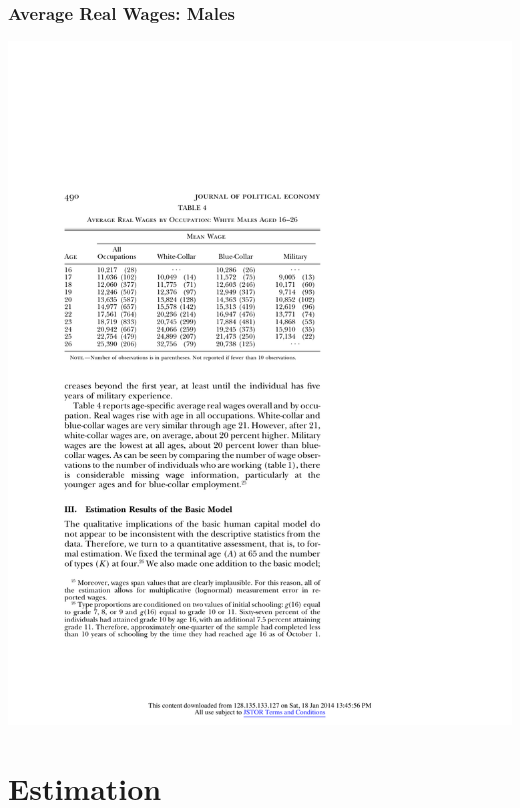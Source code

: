 \begin{frame}
	\frametitle{Average Real Wages: Males}
	\includegraphics{tab-figs/table4_1997}
\end{frame}


\section{Estimation}

